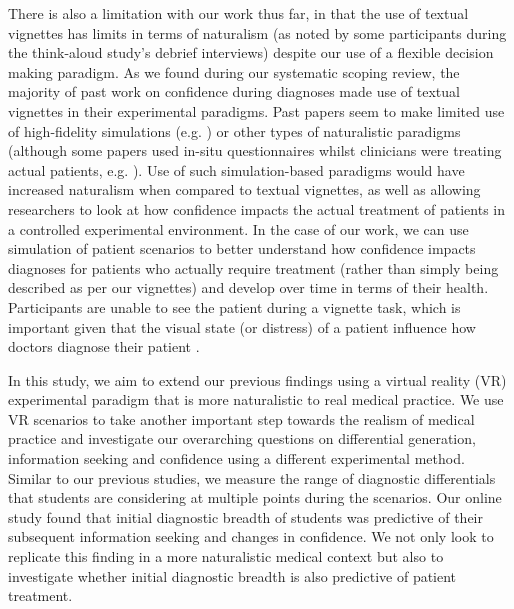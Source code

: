 \documentclass[a4paper, nobind]{templates/ociamthesis}
\begin{document}
\hfill\break
There is also a limitation with our work thus far, in that the use of textual vignettes has limits in terms of naturalism (as noted by some participants during the think-aloud study's debrief interviews) despite our use of a flexible decision making paradigm. As we found during our systematic scoping review, the majority of past work on confidence during diagnoses made use of textual vignettes in their experimental paradigms. Past papers seem to make limited use of high-fidelity simulations (e.g. \autocite{yang_effect_2012,garbayo_metacognitive_2023}) or other types of naturalistic paradigms (although some papers used in-situ questionnaires whilst clinicians were treating actual patients, e.g. \autocite{calman_variability_1992,hageman_surgeon_2013,gupta_associations_2023}). Use of such simulation-based paradigms would have increased naturalism when compared to textual vignettes, as well as allowing researchers to look at how confidence impacts the actual treatment of patients in a controlled experimental environment. In the case of our work, we can use simulation of patient scenarios to better understand how confidence impacts diagnoses for patients who actually require treatment (rather than simply being described as per our vignettes) and develop over time in terms of their health. Participants are unable to see the patient during a vignette task, which is important given that the visual state (or distress) of a patient influence how doctors diagnose their patient \autocite{brooks_difficulty_2000,sibbald_eyeballing_2017}.

\hfill\break
In this study, we aim to extend our previous findings using a virtual reality (VR) experimental paradigm that is more naturalistic to real medical practice. We use VR scenarios to take another important step towards the realism of medical practice and investigate our overarching questions on differential generation, information seeking and confidence using a different experimental method. Similar to our previous studies, we measure the range of diagnostic differentials that students are considering at multiple points during the scenarios. Our online study found that initial diagnostic breadth of students was predictive of their subsequent information seeking and changes in confidence. We not only look to replicate this finding in a more naturalistic medical context but also to investigate whether initial diagnostic breadth is also predictive of patient treatment.
\end{document}
